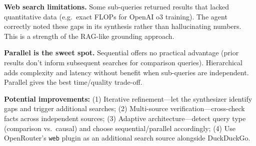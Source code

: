 \documentclass[11pt,a4paper]{article}
\begin{document}
\textbf{Web search limitations.} Some sub-queries returned results that lacked quantitative data (e.g.\ exact FLOPs for OpenAI o3 training). The agent correctly noted these gaps in its synthesis rather than hallucinating numbers. This is a strength of the RAG-like grounding approach.

\textbf{Parallel is the sweet spot.} Sequential offers no practical advantage (prior results don't inform subsequent searches for comparison queries). Hierarchical adds complexity and latency without benefit when sub-queries are independent. Parallel gives the best time/quality trade-off.

\textbf{Potential improvements:} (1) Iterative refinement---let the synthesizer identify gaps and trigger additional searches; (2) Multi-source verification---cross-check facts across independent sources; (3) Adaptive architecture---detect query type (comparison vs.\ causal) and choose sequential/parallel accordingly; (4) Use OpenRouter's \texttt{web} plugin as an additional search source alongside DuckDuckGo.
\end{document}
